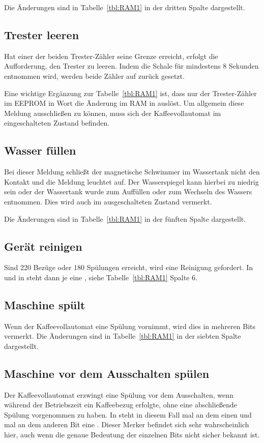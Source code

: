 Die Änderungen sind in Tabelle~\ref{tbl:RAM1} in der dritten Spalte dargestellt.

\subsection{Trester leeren}
Hat einer der beiden Trester-Zähler seine Grenze erreicht, erfolgt die Aufforderung, den Trester zu leeren.
Indem die Schale für mindestens 8 Sekunden entnommen wird, werden beide Zähler auf  zurück gesetzt.

Eine wichtige Ergänzung zur Tabelle~\ref{tbl:RAM1} ist, dass nur der Trester-Zähler im \ac{EEPROM} in Wort  die Änderung im \ac{RAM} in  auslöst.
Um allgemein diese Meldung ausschließen zu können, muss sich der Kaffeevollautomat im eingeschalteten Zustand befinden.

\subsection{Wasser füllen} %
Bei dieser Meldung schließt der magnetische Schwimmer im Wassertank nicht den Kontakt und die Meldung leuchtet auf.
Der Wasserspiegel kann hierbei zu niedrig sein oder der Wassertank wurde zum Auffüllen oder zum Wechseln des Wassers entnommen.
Dies wird auch im ausgeschalteten Zustand vermerkt.

Die Änderungen sind in Tabelle~\ref{tbl:RAM1} in der fünften Spalte dargestellt.

\subsection{Gerät reinigen}
Sind 220 Bezüge oder 180 Spülungen erreicht, wird eine Reinigung gefordert.
In  und in  steht dann je eine , siehe Tabelle~\ref{tbl:RAM1} Spalte 6.

\subsection{Maschine spült}
Wenn der Kaffeevollautomat eine Spülung vornimmt, wird dies in mehreren Bits vermerkt.
Die Änderungen sind in Tabelle~\ref{tbl:RAM1} in der siebten Spalte dargestellt.

\subsection{Maschine vor dem Ausschalten spülen}
Der Kaffeevollautomat erzwingt eine Spülung vor dem Ausschalten, wenn während der Betriebszeit ein Kaffeebezug erfolgte, ohne eine abschließende Spülung vorgenommen zu haben.
In  steht in diesem Fall mal an dem einen und mal an dem anderen Bit eine .
Dieser Merker befindet sich sehr wahrscheinlich hier, auch wenn die genaue Bedeutung der einzelnen Bits nicht sicher bekannt ist.

